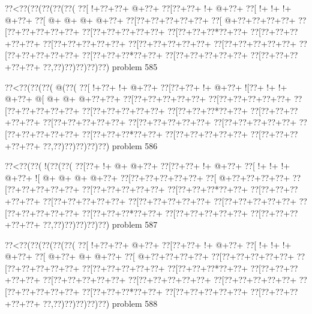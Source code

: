 \vbox{\vbox{\goo
\0??<\0??(\0??(\0??(\0??(\0??(
\0??[\- !+\0??+\0??+\- @+\0??+
\0??[\0??+\0??+\- !+\- @+\0??+
\0??[\- !+\- !+\- !+\- @+\0??+
\0??[\- @+\- @+\- @+\- @+\0??+
\0??[\0??+\0??+\0??+\0??+\0??+
\0??[\- @+\0??+\0??+\0??+\0??+
\0??[\0??+\0??+\0??+\0??+\0??+
\0??[\0??+\0??+\0??+\0??+\0??+
\0??[\0??+\0??+\0??*\0??+\0??+
\0??[\0??+\0??+\0??+\0??+\0??+
\0??[\0??+\0??+\0??+\0??+\0??+
\0??[\0??+\0??+\0??+\0??+\0??+
\0??[\0??+\0??+\0??+\0??+\0??+
\0??[\0??+\0??+\0??+\0??+\0??+
\0??[\0??+\0??+\0??*\0??+\0??+
\0??[\0??+\0??+\0??+\0??+\0??+
\0??[\0??+\0??+\0??+\0??+\0??+
\0??,\0??)\0??)\0??)\0??)\0??)
}
\hfil problem 585\hfil\break
}

\vbox{\vbox{\goo
\0??<\0??(\0??(\0??(\- @(\0??(
\0??[\- !+\0??+\- !+\- @+\0??+
\0??[\0??+\0??+\- !+\- @+\0??+
\- ![\0??+\- !+\- !+\- @+\0??+
\- @[\- @+\- @+\- @+\0??+\0??+
\0??[\0??+\0??+\0??+\0??+\0??+
\0??[\0??+\0??+\0??+\0??+\0??+
\0??[\0??+\0??+\0??+\0??+\0??+
\0??[\0??+\0??+\0??+\0??+\0??+
\0??[\0??+\0??+\0??*\0??+\0??+
\0??[\0??+\0??+\0??+\0??+\0??+
\0??[\0??+\0??+\0??+\0??+\0??+
\0??[\0??+\0??+\0??+\0??+\0??+
\0??[\0??+\0??+\0??+\0??+\0??+
\0??[\0??+\0??+\0??+\0??+\0??+
\0??[\0??+\0??+\0??*\0??+\0??+
\0??[\0??+\0??+\0??+\0??+\0??+
\0??[\0??+\0??+\0??+\0??+\0??+
\0??,\0??)\0??)\0??)\0??)\0??)
}
\hfil problem 586\hfil\break
}

\vbox{\vbox{\goo
\0??<\0??(\0??(\- !(\0??(\0??(
\0??[\0??+\- !+\- @+\- @+\0??+
\0??[\0??+\0??+\- !+\- @+\0??+
\0??[\- !+\- !+\- !+\- @+\0??+
\- ![\- @+\- @+\- @+\- @+\0??+
\0??[\0??+\0??+\0??+\0??+\0??+
\0??[\- @+\0??+\0??+\0??+\0??+
\0??[\0??+\0??+\0??+\0??+\0??+
\0??[\0??+\0??+\0??+\0??+\0??+
\0??[\0??+\0??+\0??*\0??+\0??+
\0??[\0??+\0??+\0??+\0??+\0??+
\0??[\0??+\0??+\0??+\0??+\0??+
\0??[\0??+\0??+\0??+\0??+\0??+
\0??[\0??+\0??+\0??+\0??+\0??+
\0??[\0??+\0??+\0??+\0??+\0??+
\0??[\0??+\0??+\0??*\0??+\0??+
\0??[\0??+\0??+\0??+\0??+\0??+
\0??[\0??+\0??+\0??+\0??+\0??+
\0??,\0??)\0??)\0??)\0??)\0??)
}
\hfil problem 587\hfil\break
}

\vbox{\vbox{\goo
\0??<\0??(\0??(\0??(\0??(\0??(
\0??[\- !+\0??+\0??+\- @+\0??+
\0??[\0??+\0??+\- !+\- @+\0??+
\0??[\- !+\- !+\- !+\- @+\0??+
\0??[\- @+\0??+\- @+\- @+\0??+
\0??[\- @+\0??+\0??+\0??+\0??+
\0??[\0??+\0??+\0??+\0??+\0??+
\0??[\0??+\0??+\0??+\0??+\0??+
\0??[\0??+\0??+\0??+\0??+\0??+
\0??[\0??+\0??+\0??*\0??+\0??+
\0??[\0??+\0??+\0??+\0??+\0??+
\0??[\0??+\0??+\0??+\0??+\0??+
\0??[\0??+\0??+\0??+\0??+\0??+
\0??[\0??+\0??+\0??+\0??+\0??+
\0??[\0??+\0??+\0??+\0??+\0??+
\0??[\0??+\0??+\0??*\0??+\0??+
\0??[\0??+\0??+\0??+\0??+\0??+
\0??[\0??+\0??+\0??+\0??+\0??+
\0??,\0??)\0??)\0??)\0??)\0??)
}
\hfil problem 588\hfil\break
}

